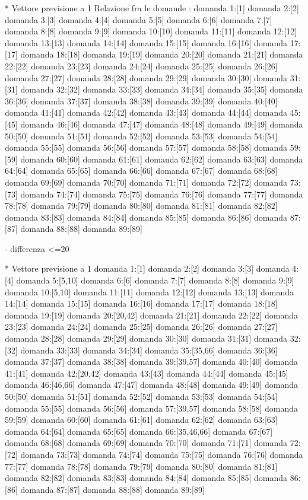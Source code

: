 * Vettore previsione a 1
Relazione fra le domande :
domanda 1:[1]
domanda 2:[2]
domanda 3:[3]
domanda 4:[4]
domanda 5:[5]
domanda 6:[6]
domanda 7:[7]
domanda 8:[8]
domanda 9:[9]
domanda 10:[10]
domanda 11:[11]
domanda 12:[12]
domanda 13:[13]
domanda 14:[14]
domanda 15:[15]
domanda 16:[16]
domanda 17:[17]
domanda 18:[18]
domanda 19:[19]
domanda 20:[20]
domanda 21:[21]
domanda 22:[22]
domanda 23:[23]
domanda 24:[24]
domanda 25:[25]
domanda 26:[26]
domanda 27:[27]
domanda 28:[28]
domanda 29:[29]
domanda 30:[30]
domanda 31:[31]
domanda 32:[32]
domanda 33:[33]
domanda 34:[34]
domanda 35:[35]
domanda 36:[36]
domanda 37:[37]
domanda 38:[38]
domanda 39:[39]
domanda 40:[40]
domanda 41:[41]
domanda 42:[42]
domanda 43:[43]
domanda 44:[44]
domanda 45:[45]
domanda 46:[46]
domanda 47:[47]
domanda 48:[48]
domanda 49:[49]
domanda 50:[50]
domanda 51:[51]
domanda 52:[52]
domanda 53:[53]
domanda 54:[54]
domanda 55:[55]
domanda 56:[56]
domanda 57:[57]
domanda 58:[58]
domanda 59:[59]
domanda 60:[60]
domanda 61:[61]
domanda 62:[62]
domanda 63:[63]
domanda 64:[64]
domanda 65:[65]
domanda 66:[66]
domanda 67:[67]
domanda 68:[68]
domanda 69:[69]
domanda 70:[70]
domanda 71:[71]
domanda 72:[72]
domanda 73:[73]
domanda 74:[74]
domanda 75:[75]
domanda 76:[76]
domanda 77:[77]
domanda 78:[78]
domanda 79:[79]
domanda 80:[80]
domanda 81:[81]
domanda 82:[82]
domanda 83:[83]
domanda 84:[84]
domanda 85:[85]
domanda 86:[86]
domanda 87:[87]
domanda 88:[88]
domanda 89:[89]

- differenza <=20

* Vettore previsione a 1
domanda 1:[1]
domanda 2:[2]
domanda 3:[3]
domanda 4:[4]
domanda 5:[5,10]
domanda 6:[6]
domanda 7:[7]
domanda 8:[8]
domanda 9:[9]
domanda 10:[5,10]
domanda 11:[11]
domanda 12:[12]
domanda 13:[13]
domanda 14:[14]
domanda 15:[15]
domanda 16:[16]
domanda 17:[17]
domanda 18:[18]
domanda 19:[19]
domanda 20:[20,42]
domanda 21:[21]
domanda 22:[22]
domanda 23:[23]
domanda 24:[24]
domanda 25:[25]
domanda 26:[26]
domanda 27:[27]
domanda 28:[28]
domanda 29:[29]
domanda 30:[30]
domanda 31:[31]
domanda 32:[32]
domanda 33:[33]
domanda 34:[34]
domanda 35:[35,66]
domanda 36:[36]
domanda 37:[37]
domanda 38:[38]
domanda 39:[39,57]
domanda 40:[40]
domanda 41:[41]
domanda 42:[20,42]
domanda 43:[43]
domanda 44:[44]
domanda 45:[45]
domanda 46:[46,66]
domanda 47:[47]
domanda 48:[48]
domanda 49:[49]
domanda 50:[50]
domanda 51:[51]
domanda 52:[52]
domanda 53:[53]
domanda 54:[54]
domanda 55:[55]
domanda 56:[56]
domanda 57:[39,57]
domanda 58:[58]
domanda 59:[59]
domanda 60:[60]
domanda 61:[61]
domanda 62:[62]
domanda 63:[63]
domanda 64:[64]
domanda 65:[65]
domanda 66:[35,46,66]
domanda 67:[67]
domanda 68:[68]
domanda 69:[69]
domanda 70:[70]
domanda 71:[71]
domanda 72:[72]
domanda 73:[73]
domanda 74:[74]
domanda 75:[75]
domanda 76:[76]
domanda 77:[77]
domanda 78:[78]
domanda 79:[79]
domanda 80:[80]
domanda 81:[81]
domanda 82:[82]
domanda 83:[83]
domanda 84:[84]
domanda 85:[85]
domanda 86:[86]
domanda 87:[87]
domanda 88:[88]
domanda 89:[89]

